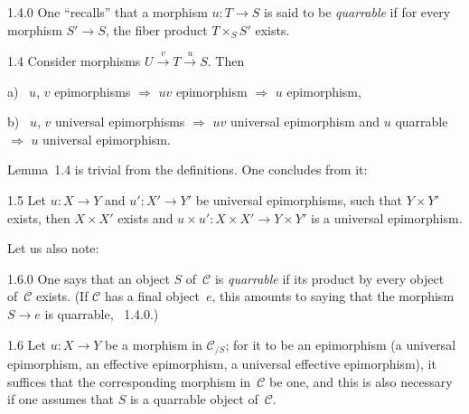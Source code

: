 \begin{definition}{1.4.0}
\label{IV.1.4.0}
{\renewcommand{\thefootnote}{(4)}}%
One ``recalls'' that a morphism \(u\colon T\to S\) is said to be
\emph{quarrable} if for every morphism \(S'\to S\), the fiber product
\(T\times_{S}S'\) exists.
\end{definition}

\begin{lemma}{1.4}
\label{IV.1.4}
Consider morphisms \(U\xrightarrow{v}T\xrightarrow{u}S\). Then

a)~ \(u\), \(v\) epimorphisms \(\Rightarrow\) \(uv\) epimorphism \(\Rightarrow\)
\(u\) epimorphism,

b)~ \(u\), \(v\) universal epimorphisms \(\Rightarrow\) \(uv\) universal
epimorphism and \(u\) quarrable \(\Rightarrow\) \(u\) universal epimorphism.
\end{lemma}

Lemma~1.4 is trivial from the definitions. One concludes from it:

\begin{corollary}{1.5}
\label{IV.1.5}
Let \(u\colon X\to Y\) and \(u'\colon X'\to Y'\) be universal epimorphisms,
such that \(Y\times Y'\) exists, then \(X\times X'\) exists and
\(u\times u'\colon X\times X'\to Y\times Y'\) is a universal epimorphism.
\end{corollary}

Let us also note:

\begin{definition}{1.6.0}
\label{IV.1.6.0}
{\renewcommand{\thefootnote}{(5)}}%
One says that an object \(S\) of~\(\mathcal{C}\) is \emph{quarrable} if its
product by every object of~\(\mathcal{C}\) exists. (If \(\mathcal{C}\) has a
final object~\(e\), this amounts to saying that the morphism \(S\to e\) is
quarrable, \cf~1.4.0.)
\end{definition}

\begin{lemma}{1.6}
\label{IV.1.6}
Let \(u\colon X\to Y\) be a morphism in \(\mathcal{C}_{/S}\); for it to be
an epimorphism (\resp a universal epimorphism, \resp an effective
epimorphism, \resp a universal effective epimorphism), it suffices that the
corresponding morphism in~\(\mathcal{C}\) be one, and this is also necessary
if one assumes that \(S\) is a quarrable object of~\(\mathcal{C}\).
\end{lemma}

